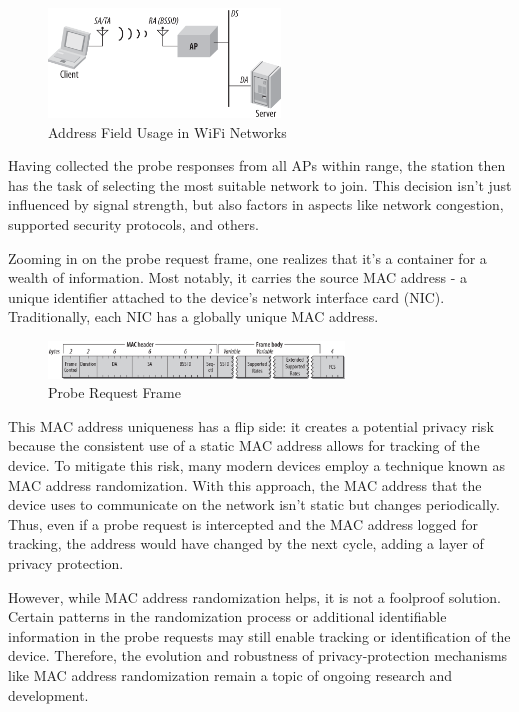 \documentclass{article}
\begin{document}
\begin{figure}[h]
    \centering
    \includegraphics[width=0.55\textwidth]{assets/address-field-usage.png}
    \caption{Address Field Usage in WiFi Networks}
    \label{fig:address-field}
\end{figure}

Having collected the probe responses from all APs within range, the station then has the task of selecting the most suitable network to join. This decision isn't just influenced by signal strength, but also factors in aspects like network congestion, supported security protocols, and others. 

Zooming in on the probe request frame, one realizes that it's a container for a wealth of information. Most notably, it carries the source MAC address - a unique identifier attached to the device's network interface card (NIC). Traditionally, each NIC has a globally unique MAC address.

\begin{figure}[h]
    \centering
    \includegraphics[width=0.7\textwidth]{assets/probe-request-frame.png}
    \caption{Probe Request Frame}
    \label{fig:probe-request-frame}
\end{figure}

This MAC address uniqueness has a flip side: it creates a potential privacy risk because the consistent use of a static MAC address allows for tracking of the device. To mitigate this risk, many modern devices employ a technique known as MAC address randomization. With this approach, the MAC address that the device uses to communicate on the network isn't static but changes periodically. Thus, even if a probe request is intercepted and the MAC address logged for tracking, the address would have changed by the next cycle, adding a layer of privacy protection.

However, while MAC address randomization helps, it is not a foolproof solution. Certain patterns in the randomization process or additional identifiable information in the probe requests may still enable tracking or identification of the device. Therefore, the evolution and robustness of privacy-protection mechanisms like MAC address randomization remain a topic of ongoing research and development. 
\end{document}

